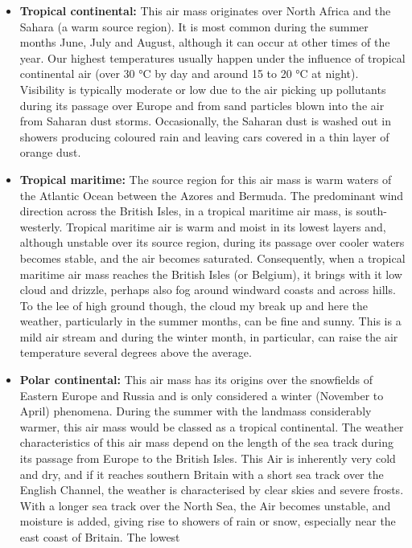 \documentclass[12pt,oneside]{book}
\providecommand{\tightlist}{%
  \setlength{\itemsep}{0pt}\setlength{\parskip}{0pt}}
\begin{document}
\begin{itemize}
\tightlist
\item
  \textbf{Tropical continental:} This air mass originates over North
  Africa and the Sahara (a warm source region). It is most common during
  the summer months June, July and August, although it can occur at
  other times of the year. Our highest temperatures usually happen under
  the influence of tropical continental air (over 30 °C by day and
  around 15 to 20 °C at night). Visibility is typically moderate or low
  due to the air picking up pollutants during its passage over Europe
  and from sand particles blown into the air from Saharan dust storms.
  Occasionally, the Saharan dust is washed out in showers producing
  coloured rain and leaving cars covered in a thin layer of orange dust.
\item
  \textbf{Tropical maritime:} The source region for this air mass is
  warm waters of the Atlantic Ocean between the Azores and Bermuda. The
  predominant wind direction across the British Isles, in a tropical
  maritime air mass, is south-westerly. Tropical maritime air is warm
  and moist in its lowest layers and, although unstable over its source
  region, during its passage over cooler waters becomes stable, and the
  air becomes saturated. Consequently, when a tropical maritime air mass
  reaches the British Isles (or Belgium), it brings with it low cloud
  and drizzle, perhaps also fog around windward coasts and across hills.
  To the lee of high ground though, the cloud my break up and here the
  weather, particularly in the summer months, can be fine and sunny.
  This is a mild air stream and during the winter month, in particular,
  can raise the air temperature several degrees above the average.
\item
  \textbf{Polar continental:} This air mass has its origins over the
  snowfields of Eastern Europe and Russia and is only considered a
  winter (November to April) phenomena. During the summer with the
  landmass considerably warmer, this air mass would be classed as a
  tropical continental. The weather characteristics of this air mass
  depend on the length of the sea track during its passage from Europe
  to the British Isles. This Air is inherently very cold and dry, and if
  it reaches southern Britain with a short sea track over the English
  Channel, the weather is characterised by clear skies and severe
  frosts. With a longer sea track over the North Sea, the Air becomes
  unstable, and moisture is added, giving rise to showers of rain or
  snow, especially near the east coast of Britain. The lowest

\end{itemize}
\end{document}

